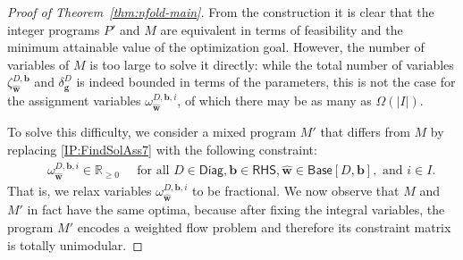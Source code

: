 \documentclass{theoretics}
\renewcommand{\geq}{\geqslant}
\newcommand{\R}{\mathbb{R}}
\newcommand{\myRn}{\R_{\geq 0}} %
\newcommand{\tup}[1]{{\mathbf{#1}}}
\newcommand{\ww}{\tup w}
\newcommand{\whww}{{\widehat{\ww}}}
\newcommand{\bb}{\tup b}
\renewcommand{\gg}{\tup g}
\newcommand{\RHS}{\mathsf{RHS}}
\newcommand{\Diag}{\mathsf{Diag}}
\newcommand{\Base}{\mathsf{Base}}
\begin{document}
\begin{proof}[Proof of Theorem~\ref{thm:nfold-main}]
From the construction it is clear that the integer programs $P'$ and $M$ are equivalent in terms of feasibility and the minimum attainable value of the optimization goal. However, the number of variables of $M$ is too large to solve it directly: while the total number of variables $\zeta^{D,\bb}_{\whww}$ and $\delta^D_\gg$ is indeed bounded in terms of the parameters, this is not the case for the assignment variables $\omega^{D,\bb,i}_{\whww}$, of which there may be as many as $\Omega(|I|)$.

To solve this difficulty, we consider a mixed program $M'$ that differs from $M$ by replacing \cref{IP:FindSolAss7} with the following constraint:
\begin{align}
    & \quad\ \ \omega^{D,\bb,i}_{\whww} \in \myRn \quad\ \,\textrm{for all }D\in \Diag, \bb\in \RHS, \whww\in \Base[D,\bb], \textrm{ and } i\in I. &
\tag{C7'} \label{IP:FindSolAss7p}
\end{align}
That is, we relax variables $\omega^{D,\bb,i}_{\whww}$ to be fractional. We now observe that $M$ and $M'$ in fact have the same optima, because after fixing the integral variables, the program $M'$ encodes a weighted flow problem and therefore its constraint matrix is totally unimodular.


\end{proof}
\end{document}
